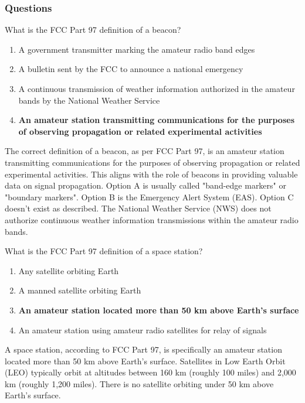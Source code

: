 \subsubsection{Questions}

\begin{tcolorbox}[colback=gray!10!white,colframe=black!75!black,title={T1A06}]
    What is the FCC Part 97 definition of a beacon?
    \begin{enumerate}[label=\Alph*),noitemsep]
        \item A government transmitter marking the amateur radio band edges
        \item A bulletin sent by the FCC to announce a national emergency
        \item A continuous transmission of weather information authorized in the amateur bands by the National Weather Service
        \item \textbf{An amateur station transmitting communications for the purposes of observing propagation or related experimental activities}
    \end{enumerate}
\end{tcolorbox}
The correct definition of a beacon, as per FCC Part 97, is an amateur station transmitting communications for the purposes of observing propagation or related experimental activities. This aligns with the role of beacons in providing valuable data on signal propagation. Option A is usually called "band-edge markers" or "boundary markers". Option B is the Emergency Alert System (EAS). Option C doesn't exist as described. The National Weather Service (NWS) does not authorize continuous weather information transmissions within the amateur radio bands.

\begin{tcolorbox}[colback=gray!10!white,colframe=black!75!black,title={T1A07}]
    What is the FCC Part 97 definition of a space station?
    \begin{enumerate}[label=\Alph*),noitemsep]
        \item Any satellite orbiting Earth
        \item A manned satellite orbiting Earth
        \item \textbf{An amateur station located more than 50 km above Earth's surface}
        \item An amateur station using amateur radio satellites for relay of signals
    \end{enumerate}
\end{tcolorbox}
A space station, according to FCC Part 97, is specifically an amateur station located more than 50 km above Earth's surface. Satellites in Low Earth Orbit (LEO) typically orbit at altitudes between 160 km (roughly 100 miles) and 2,000 km (roughly 1,200 miles). There is no satellite orbiting under 50 km above Earth's surface.

